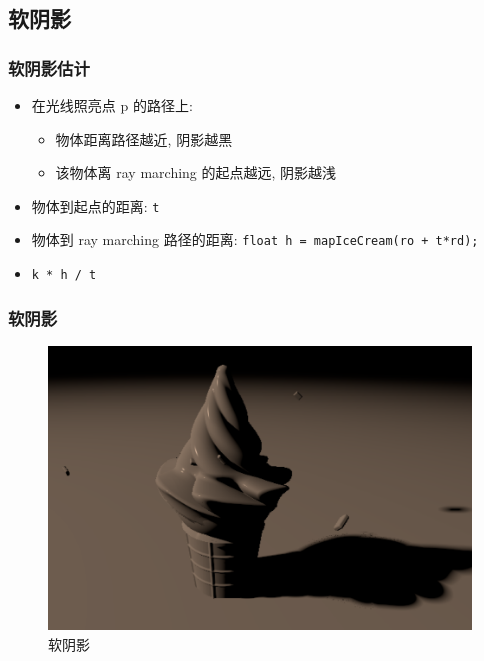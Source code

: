 \documentclass[aspectratio=169]{ctexbeamer} %
\begin{document}
\subsection{软阴影}
\begin{frame}
    \frametitle{软阴影估计}
    \begin{itemize}[<+->]
        \item 在光线照亮点 p 的路径上:
        \begin{itemize}
            \item 物体距离路径越近, 阴影越黑
            \item 该物体离 ray marching 的起点越远, 阴影越浅
        \end{itemize}
        \item 物体到起点的距离: \texttt{t}
        \item 物体到 ray marching 路径的距离: \texttt{float h = mapIceCream(ro + t*rd);}
        \item \texttt{k * h / t}
    \end{itemize}
\end{frame}
\begin{frame}
    \frametitle{软阴影}
    \begin{figure}[htbp]
        \centering
        \includegraphics[height=.75\textheight]{images/pre/softshadow.pdf}
        \caption{软阴影}
        \label{fig:softshadow}
    \end{figure}
\end{frame}
\end{document}
